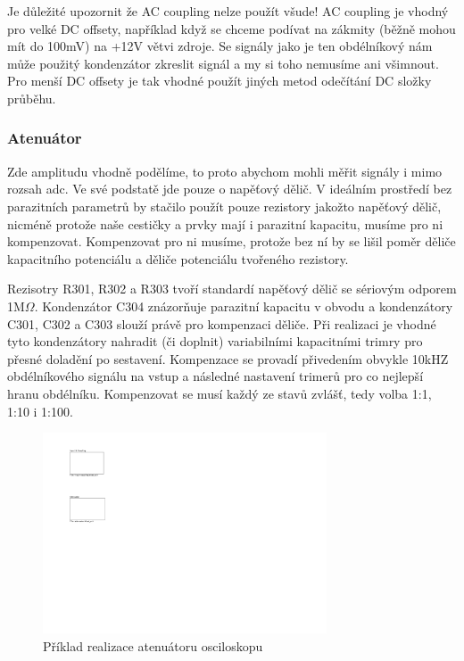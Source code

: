 \documentclass[12pt]{article}
\begin{document}
Je důležité upozornit že AC coupling nelze použít všude! AC coupling je vhodný pro velké DC offsety,
například když se chceme podívat na zákmity (běžně mohou mít do 100mV) na +12V větvi zdroje.
Se signály jako je ten obdélníkový nám může použitý kondenzátor zkreslit signál a my si toho
nemusíme ani všimnout. Pro menší DC offsety je tak vhodné použít jiných metod odečítání DC
složky průběhu.

\subsubsection{Atenuátor}

Zde amplitudu vhodně podělíme, to proto abychom mohli měřit signály i mimo rozsah \acrshort{adc}.
Ve své podstatě jde pouze o napěťový dělič. V ideálním prostředí bez parazitních parametrů by
stačilo použít pouze rezistory jakožto napěťový dělič, nicméně protože naše cestičky a prvky
mají i parazitní kapacitu, musíme pro ni kompenzovat. Kompenzovat pro ni musíme, protože bez ní
by se lišil poměr děliče kapacitního potenciálu a děliče potenciálu tvořeného rezistory.
\cite{AnswerCompensatedAttenuator2016}

Rezisotry R301, R302 a R303 tvoří standardí napěťový dělič se sériovým odporem 1M$\Omega$. Kondenzátor C304
znázorňuje parazitní kapacitu v obvodu a kondenzátory C301, C302 a C303 slouží právě pro kompenzaci děliče.
Při realizaci je vhodné tyto kondenzátory nahradit (či doplnit) variabilními kapacitními trimry pro
přesné doladění po sestavení. Kompenzace se provadí přivedením obvykle 10kHZ obdélníkového signálu
na vstup a následné nastavení trimerů pro co nejlepší hranu obdélníku. Kompenzovat se musí každý ze
stavů zvlášť, tedy volba 1:1, 1:10 i 1:100.

\begin{figure}[h]
    \centering
    \includegraphics[width=0.75\textwidth, page=3]{kicad-export}
    \caption{Příklad realizace atenuátoru osciloskopu}
    \label{fig:attenuator-example}
\end{figure}
\end{document}
